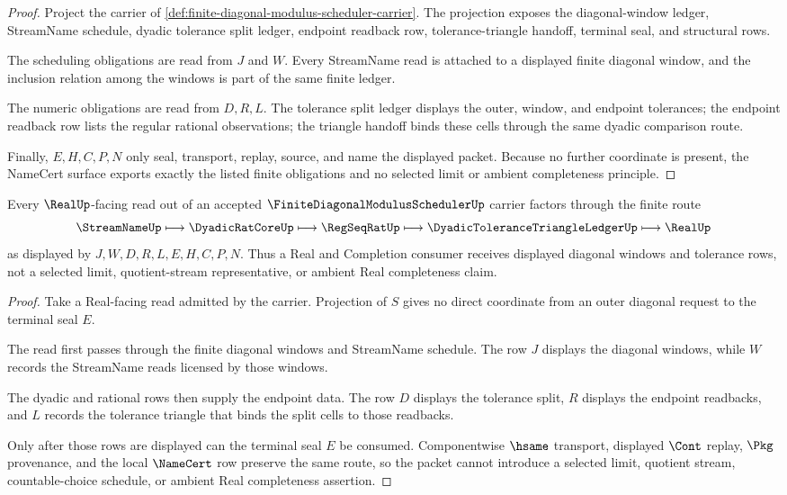 \begin{proof}
Project the carrier of \autoref{def:finite-diagonal-modulus-scheduler-carrier}. The projection exposes the diagonal-window ledger, StreamName schedule, dyadic tolerance split ledger, endpoint readback row, tolerance-triangle handoff, terminal seal, and structural rows.

The scheduling obligations are read from $J$ and $W$. Every StreamName read is attached to a displayed finite diagonal window, and the inclusion relation among the windows is part of the same finite ledger.

The numeric obligations are read from $D,R,L$. The tolerance split ledger displays the outer, window, and endpoint tolerances; the endpoint readback row lists the regular rational observations; the triangle handoff binds these cells through the same dyadic comparison route.

Finally, $E,H,C,P,N$ only seal, transport, replay, source, and name the displayed packet. Because no further coordinate is present, the NameCert surface exports exactly the listed finite obligations and no selected limit or ambient completeness principle.
\end{proof}

\begin{theorem}\label{thm:finite-diagonal-modulus-scheduler-real-handoff}
Every $\RealUp$-facing read out of an accepted $\FiniteDiagonalModulusSchedulerUp$ carrier factors through the finite route
$$
\StreamNameUp \longmapsto \DyadicRatCoreUp \longmapsto \RegSeqRatUp \longmapsto \DyadicToleranceTriangleLedgerUp \longmapsto \RealUp
$$
as displayed by $J,W,D,R,L,E,H,C,P,N$. Thus a Real and Completion consumer receives displayed diagonal windows and tolerance rows, not a selected limit, quotient-stream representative, or ambient Real completeness claim.
\end{theorem}
\begin{proof}
Take a Real-facing read admitted by the carrier. Projection of $S$ gives no direct coordinate from an outer diagonal request to the terminal seal $E$.

The read first passes through the finite diagonal windows and StreamName schedule. The row $J$ displays the diagonal windows, while $W$ records the StreamName reads licensed by those windows.

The dyadic and rational rows then supply the endpoint data. The row $D$ displays the tolerance split, $R$ displays the endpoint readbacks, and $L$ records the tolerance triangle that binds the split cells to those readbacks.

Only after those rows are displayed can the terminal seal $E$ be consumed. Componentwise $\hsame$ transport, displayed $\Cont$ replay, $\Pkg$ provenance, and the local $\NameCert$ row preserve the same route, so the packet cannot introduce a selected limit, quotient stream, countable-choice schedule, or ambient Real completeness assertion.
\end{proof}

